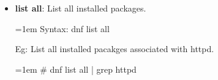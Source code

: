 \begin{flushleft}
\begin{itemize}
		
			\item \textbf{list all}: List all installed packages.
		\begin{tcolorbox}[breakable,notitle,boxrule=-0pt,colback=pink,colframe=pink]
			\color{black}
			\font=1em
			Syntax: dnf list all
			\font=4pt
		\end{tcolorbox}
		Eg: List all installed pacakges associated with httpd.
		\begin{tcolorbox}[breakable,notitle,boxrule=-0pt,colback=black,colframe=black]
			\color{green}
			\font=1em
			\# dnf list all | grep httpd
			\font=4pt
		\end{tcolorbox}
		\bigskip
		\bigskip					
		
					
	\end{itemize}
	
	
\end{flushleft}
\newpage



